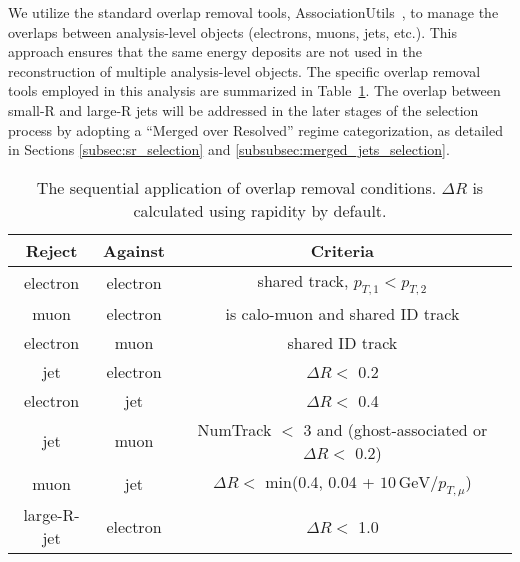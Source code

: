 
We utilize the standard overlap removal tools, AssociationUtils~\cite{Farrell2023AssociationUtils}, to manage the overlaps between analysis-level objects (electrons, muons, jets, etc.). This approach ensures that the same energy deposits are not used in the reconstruction of multiple analysis-level objects. The specific overlap removal tools employed in this analysis are summarized in Table~\ref{tab:OR}.
The overlap between small-R and large-R jets will be addressed in the later stages of the selection process by adopting a ``Merged over Resolved'' regime categorization, as detailed in Sections \ref{subsec:sr_selection} and \ref{subsubsec:merged_jets_selection}.

\begin{table}[ht]
\caption{The sequential application of overlap removal conditions. $\Delta R$ is calculated using rapidity by default.}
\label{tab:OR}
\begin{center}
\small
\begin{tabular}{|c|c|c|}
\hline
 Reject & Against & Criteria \\\hline
 electron & electron & shared track, $p_{T,1} < p_{T,2}$ \\
 muon     & electron & is calo-muon and shared ID track \\
 electron & muon     & shared ID track \\
 jet      & electron & $\Delta R <$ 0.2 \\ %
 electron & jet      & $\Delta R <$ 0.4 \\
 jet      & muon     & NumTrack $<$ 3 and (ghost-associated or $\Delta R <$ 0.2) \\
 muon     & jet      & $\Delta R <$ min(0.4, 0.04 + $10\,\text{GeV}/p_{T,\mu}$) \\ %
 large-R-jet  & electron & $\Delta R <$ 1.0 \\
\hline
\end{tabular}
\end{center}
\end{table}


